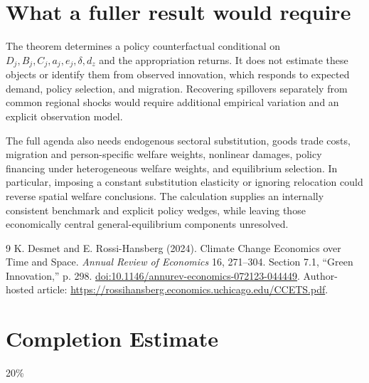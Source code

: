 \documentclass[11pt,a4paper]{article}
\theoremstyle{definition}
\theoremstyle{remark}
\begin{document}
\section{What a fuller result would require}
The theorem determines a policy counterfactual conditional on $D_j,B_j,C_j,a_j,e_j,\delta,d_z$ and the appropriation returns. It does not estimate these objects or identify them from observed innovation, which responds to expected demand, policy selection, and migration. Recovering spillovers separately from common regional shocks would require additional empirical variation and an explicit observation model.

The full agenda also needs endogenous sectoral substitution, goods trade costs, migration and person-specific welfare weights, nonlinear damages, policy financing under heterogeneous welfare weights, and equilibrium selection. In particular, imposing a constant substitution elasticity or ignoring relocation could reverse spatial welfare conclusions. The calculation supplies an internally consistent benchmark and explicit policy wedges, while leaving those economically central general-equilibrium components unresolved.
\begin{thebibliography}{9}
 K. Desmet and E. Rossi-Hansberg (2024).
Climate Change Economics over Time and Space.
\emph{Annual Review of Economics} 16, 271--304. Section 7.1, ``Green Innovation,'' p. 298.
\href{https://doi.org/10.1146/annurev-economics-072123-044449}{doi:10.1146/annurev-economics-072123-044449}.
Author-hosted article: \url{https://rossihansberg.economics.uchicago.edu/CCETS.pdf}.
\end{thebibliography}

\section{Completion Estimate}
20\%
\end{document}
